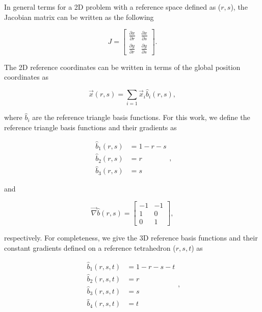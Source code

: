 In general terms for a 2D problem with a reference space defined as ($r,s$), the Jacobian matrix can be written as the following

\begin{equation}
\label{eq::App_BF_2DJac}
J = \left[
\begin{array}{cc}
\frac{\partial x}{\partial r} & \frac{\partial x}{\partial s} \\
\frac{\partial y}{\partial r} & \frac{\partial y}{\partial s}
\end{array}
\right].
\end{equation}

\noindent The 2D reference coordinates can be written in terms of the global position coordinates as

\begin{equation}
\label{eq::App_BF_glob_to_ref}
\vec{x} (r,s) = \sum\limits_{i=1} \vec{x}_i \hat{b}_i (r,s) ,
\end{equation}

\noindent where $\hat{b}_i$ are the reference triangle basis functions. For this work, we define the reference triangle basis functions and their gradients as

\begin{equation}
\label{eq::App_BF_2D_triref}
\begin{aligned}
	\hat{b}_1(r,s) & = 1-r-s \\
	\hat{b}_2(r,s) & = r \\
	\hat{b}_3(r,s) & = s 
\end{aligned},
\end{equation}

\noindent and

\begin{equation}
\label{eq::App_BF_2D_triref_grad}
\vec{\nabla} \hat{b} (r,s)  = 
\left[
\begin{array}{cc}
-1 & -1 \\
1 & 0 \\
0 & 1
\end{array}
\right],
\end{equation}

\noindent respectively. For completeness, we give the 3D reference basis functions and their constant gradients defined on a reference tetrahedron ($r,s,t$) as

\begin{equation}
\label{eq::3D_tetref_BF}
\begin{aligned}
	\hat{b}_1(r,s,t) & = 1-r-s-t \\
	\hat{b}_2(r,s,t) & = r \\
	\hat{b}_3(r,s,t) & = s \\
	\hat{b}_4(r,s,t) & = t
\end{aligned} ,
\end{equation}

